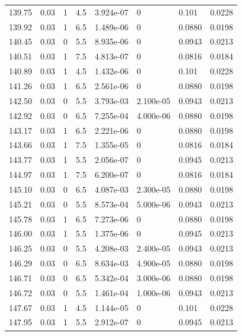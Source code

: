 \documentclass[preview]{standalone}
\begin{document}
{{{\begin{tabular}{L{1.2cm}C{1.2cm} C{0.3cm}C{0.5cm} C{1.4cm}C{1.4cm} C{1.4cm}C{1.4cm}}
  139.75  &  0.03  & 1     & 4.5 &  3.924e-07  & 0  & 0.101 &  0.0228   \\ 
  139.92  &  0.03  & 1     & 6.5 &  1.489e-06  & 0  & 0.0880 &  0.0198   \\ 
  140.45  &  0.03  & 0     & 5.5 &  8.935e-06  & 0  & 0.0943 &  0.0213   \\ 
  140.51  &  0.03  & 1     & 7.5 &  4.813e-07  & 0  & 0.0816 &  0.0184   \\ 
  140.89  &  0.03  & 1     & 4.5 &  1.432e-06  & 0  & 0.101 &  0.0228   \\ 
  141.26  &  0.03  & 1     & 6.5 &  2.561e-06  & 0  & 0.0880 &  0.0198   \\ 
  142.50  &  0.03  & 0     & 5.5 &  3.793e-03  & 2.100e-05  & 0.0943 &  0.0213   \\ 
  142.92  &  0.03  & 0     & 6.5 &  7.255e-04  & 4.000e-06  & 0.0880 &  0.0198   \\ 
  143.17  &  0.03  & 1     & 6.5 &  2.221e-06  & 0  & 0.0880 &  0.0198   \\ 
  143.66  &  0.03  & 1     & 7.5 &  1.355e-05  & 0  & 0.0816 &  0.0184   \\ 
  143.77  &  0.03  & 1     & 5.5 &  2.056e-07  & 0  & 0.0945 &  0.0213   \\ 
  144.97  &  0.03  & 1     & 7.5 &  6.200e-07  & 0  & 0.0816 &  0.0184   \\ 
  145.10  &  0.03  & 0     & 6.5 &  4.087e-03  & 2.300e-05  & 0.0880 &  0.0198   \\ 
  145.21  &  0.03  & 0     & 5.5 &  8.573e-04  & 5.000e-06  & 0.0943 &  0.0213   \\ 
  145.78  &  0.03  & 1     & 6.5 &  7.273e-06  & 0  & 0.0880 &  0.0198   \\ 
  146.00  &  0.03  & 1     & 5.5 &  1.375e-06  & 0  & 0.0945 &  0.0213   \\ 
  146.25  &  0.03  & 0     & 5.5 &  4.208e-03  & 2.400e-05  & 0.0943 &  0.0213   \\ 
  146.29  &  0.03  & 0     & 6.5 &  8.634e-03  & 4.900e-05  & 0.0880 &  0.0198   \\ 
  146.71  &  0.03  & 0     & 6.5 &  5.342e-04  & 3.000e-06  & 0.0880 &  0.0198   \\ 
  146.72  &  0.03  & 0     & 5.5 &  1.461e-04  & 1.000e-06  & 0.0943 &  0.0213   \\ 
  147.67  &  0.03  & 1     & 4.5 &  1.144e-05  & 0  & 0.101 &  0.0228   \\ 
  147.95  &  0.03  & 1     & 5.5 &  2.912e-07  & 0  & 0.0945 &  0.0213   \\ 

\end{tabular}}}}
\end{document}

